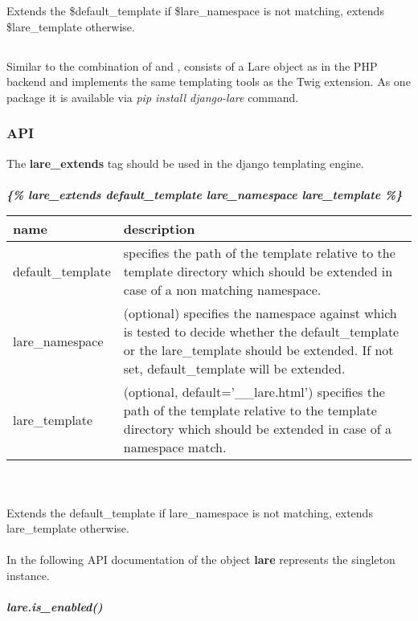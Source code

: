 \noindent{}Extends the \$default\_template if \$lare\_namespace is not matching, extends \$lare\_template otherwise.


\subsection{\DjangoLare{}}
Similar to the combination of \phpLare{} and \twigLare{}, \djangoLare{} consists of a Lare object as in the PHP backend and implements the same templating tools as the Twig extension.
As one package it is available via \emph{pip install django-lare} command.

\subsubsection{API}
The \textbf{lare\_extends} tag should be used in the django templating engine.
\\
\\
\large{\textbf{\textit{\{\% lare\_extends default\_template lare\_namespace lare\_template \%\}}}}
\\
\begin{tabular}{|p{4cm}|p{9.3cm}|}
    \hline
    \textbf{name} & \textbf{description} \\
    \hline
    default\_template & specifies the path of the template relative to the template directory which should be extended in case of a non matching namespace. \\
    \hline
    lare\_namespace & (optional) specifies the namespace against which is tested to decide whether the default\_template or the lare\_template should be extended. If not set, default\_template will be extended. \\
    \hline
    lare\_template & (optional, default='\_\_lare.html') specifies the path of the template relative to the template directory which should be extended in case of a name\-space match. \\
    \hline
\end{tabular}
\\
\\
Extends the default\_template if lare\_namespace is not matching, extends lare\_template otherwise.
\\
\\
In the following API documentation of the \textbf{\lare{}} object \textbf{lare} represents the singleton instance.
\\
\\
\large{\textbf{\textit{lare.is\_enabled()}}}
\\
